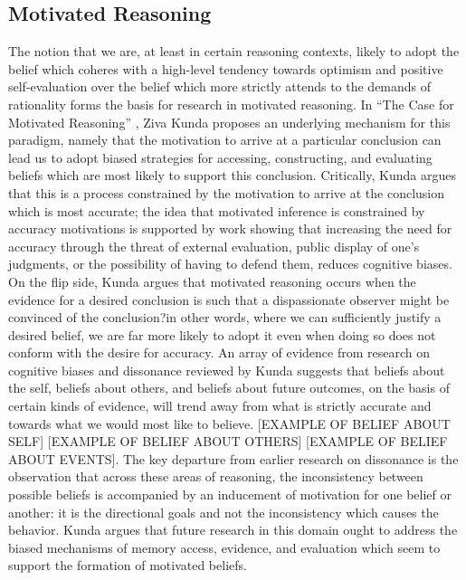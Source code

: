 \documentclass{article}
\begin{document}
\subsection{Motivated Reasoning}
The notion that we are, at least in certain reasoning contexts, likely to adopt the belief which coheres with a high-level tendency towards optimism and positive self-evaluation over the belief which more strictly attends to the demands of rationality forms the basis for research in motivated reasoning. In ``The Case for Motivated Reasoning'' \citet{Kunda1990}, Ziva Kunda proposes an underlying mechanism for this paradigm, namely that the motivation to arrive at a particular conclusion can lead us to adopt biased strategies for accessing, constructing, and evaluating beliefs which are most likely to support this conclusion. Critically, Kunda argues that this is a process constrained by the motivation to arrive at the conclusion which is most accurate; the idea that motivated inference is constrained by accuracy motivations is supported by work showing that increasing the need for accuracy through the threat of external evaluation, public display of one's judgments, or the possibility of having to defend them, reduces cognitive biases. On the flip side, Kunda argues that motivated reasoning occurs when the evidence for a desired conclusion is such that a dispassionate observer might be convinced of the conclusion?in other words, where we can sufficiently justify a desired belief, we are far more likely to adopt it even when doing so does not conform with the desire for accuracy. An array of evidence from research on cognitive biases and dissonance reviewed by Kunda suggests that beliefs about the self, beliefs about others, and beliefs about future outcomes, on the basis of certain kinds of evidence, will trend away from what is strictly accurate and towards what we would most like to believe. [EXAMPLE OF BELIEF ABOUT SELF] [EXAMPLE OF BELIEF ABOUT OTHERS] [EXAMPLE OF BELIEF ABOUT EVENTS]. The key departure from earlier research on dissonance is the observation that across these areas of reasoning, the inconsistency between possible beliefs is accompanied by an inducement of motivation for one belief or another: it is the directional goals and not the inconsistency which causes the behavior. Kunda argues that future research in this domain ought to address the biased mechanisms of memory access, evidence, and evaluation which seem to support the formation of motivated beliefs. 
\end{document}
